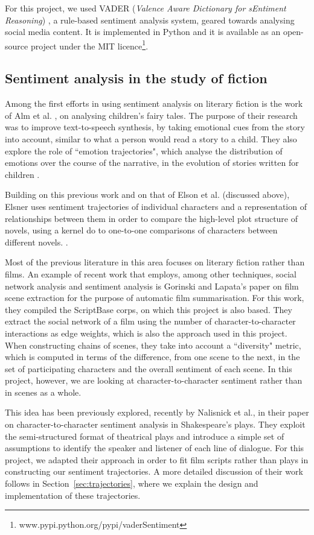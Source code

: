 \documentclass[bsc,frontabs,singlespacing,parskip, twoside]{infthesis}
\begin{document}
For this project, we used VADER (\textit{Valence Aware Dictionary for sEntiment Reasoning}) \cite{hutto2014vader}, a rule-based sentiment analysis system, geared towards analysing social media content. It is implemented in Python and it is available as an open-source project under the MIT licence\footnote{www.pypi.python.org/pypi/vaderSentiment}.


\subsection{Sentiment analysis in the study of fiction}
Among the first efforts in using sentiment analysis on literary fiction is the work of Alm et al. \cite{alm2005emotions}, on analysing children's fairy tales. The purpose of their research was to improve text-to-speech synthesis, by taking emotional cues from the story into account, similar to what a person would read a story to a child. They also explore the role of ``emotion trajectories", which analyse the distribution of emotions over the course of the narrative, in the evolution of stories written for children \cite{alm2005emotional}.

Building on this previous work and on that of Elson et al. \cite{Elson2010} (discussed above), Elsner uses sentiment trajectories of individual characters and a representation of relationships between them in order to compare the high-level plot structure of novels, using a kernel do to one-to-one comparisons of characters between different novels. \cite{elsner2012character}.

Most of the previous literature in this area focuses on literary fiction rather than films. An example of recent work that employs, among other techniques, social network analysis and sentiment analysis is Gorinski and Lapata's paper \cite{Gorinski2015} on film scene extraction for the purpose of automatic film summarisation. For this work, they compiled the ScriptBase corps, on which this project is also based. They extract the social network of a film using the number of character-to-character interactions as edge weights, which is also the approach used in this project. When constructing chains of scenes, they take into account a ``diversity" metric, which is computed in terms of the difference, from one scene to the next, in the set of participating characters and the overall sentiment of each scene. In this project, however, we are looking at character-to-character sentiment rather than in scenes as a whole.

This idea has been previously explored, recently by Nalisnick et al.\cite{Nalisnick2013}, in their paper on character-to-character sentiment analysis in Shakespeare's plays. They exploit the semi-structured format of theatrical plays and introduce a simple set of assumptions to identify the speaker and listener of each line of dialogue. For this project, we adapted their approach in order to fit film scripts rather than plays in constructing our sentiment trajectories. A more detailed discussion of their work follows in Section~\ref{sec:trajectories}, where we explain the design and implementation of these trajectories.
\end{document}
